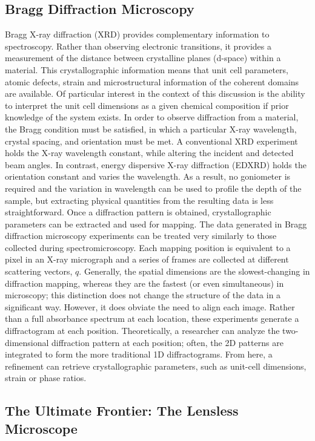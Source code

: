 \documentclass[journal=cmatex,manuscript=perspective]{achemso}
\begin{document}
\subsection{Bragg Diffraction Microscopy}

Bragg X-ray diffraction (XRD) provides complementary information to
spectroscopy. Rather than observing electronic transitions, it
provides a measurement of the distance between crystalline planes
(d-space) within a material. This crystallographic information means
that unit cell parameters, atomic defects, strain and microstructural
information of the coherent domains are available. Of particular
interest in the context of this discussion is the ability to interpret
the unit cell dimensions as a given chemical composition if prior
knowledge of the system exists. In order to observe diffraction from a
material, the Bragg condition must be satisfied, in which a particular
X-ray wavelength, crystal spacing, and orientation must be met. A
conventional XRD experiment holds the X-ray wavelength constant, while
altering the incident and detected beam angles. In contrast, energy
dispersive X-ray diffraction (EDXRD) holds the orientation constant
and varies the wavelength. As a result, no goniometer is required and
the variation in wavelength can be used to profile the depth of the
sample, but extracting physical quantities from the resulting data is
less straightforward\cite{michel2005,strobridge2015}. Once a
diffraction pattern is obtained, crystallographic parameters can be
extracted and used for mapping. The data generated in Bragg
diffraction microscopy experiments can be treated very similarly to
those collected during spectromicroscopy. Each mapping position is
equivalent to a pixel in an X-ray micrograph and a series of frames
are collected at different scattering vectors, $q$. Generally, the
spatial dimensions are the slowest-changing in diffraction mapping,
whereas they are the fastest (or even simultaneous) in microscopy;
this distinction does not change the structure of the data in a
significant way. However, it does obviate the need to align each
image. Rather than a full absorbance spectrum at each location, these
experiments generate a diffractogram at each position. Theoretically,
a researcher can analyze the two-dimensional diffraction pattern at
each position; often, the 2D patterns are integrated to form the more
traditional 1D diffractograms. From here, a refinement can retrieve
crystallographic parameters, such as unit-cell dimensions, strain or
phase ratios.

\subsection{The Ultimate Frontier: The Lensless Microscope}
\end{document}
